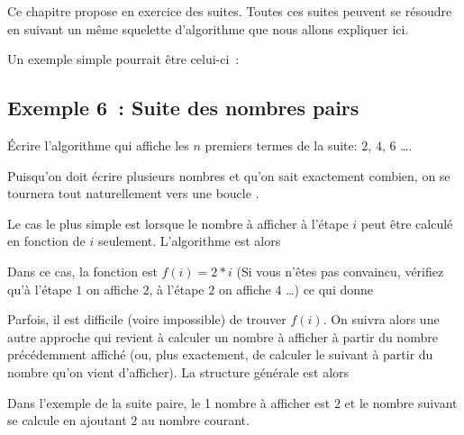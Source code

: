 Ce chapitre propose en exercice des suites.
Toutes ces suites peuvent se résoudre 
en suivant un même squelette d'algorithme 
que nous allons expliquer ici.

Un exemple simple pourrait être celui-ci~:

\subsection{Exemple 6~: Suite des nombres pairs}
	Écrire l'algorithme qui affiche les $n$ premiers termes
	de la suite: $2$, $4$, $6$ \dots.


Puisqu'on doit écrire plusieurs nombres et qu'on sait exactement combien,
on se tournera tout naturellement vers une boucle .

Le cas le plus simple est lorsque le nombre à afficher à l'étape $i$
peut être calculé en fonction de $i$ seulement.
L'algorithme est alors


Dans ce cas, la fonction est $f(i)=2*i$
(Si vous n'êtes pas convaincu, vérifiez qu'à l'étape $1$ on affiche $2$,
à l'étape $2$ on affiche $4$ \dots) ce qui donne


Parfois, il est difficile (voire impossible) de trouver $f(i)$.
On suivra alors une autre approche qui revient à calculer un nombre
à afficher à partir du nombre précédemment affiché
(ou, plus exactement, de calculer le suivant à partir du nombre
qu'on vient d'afficher).
La structure générale est alors


Dans l'exemple de la suite paire, le 1 nombre à afficher est $2$
et le nombre suivant se calcule en ajoutant $2$ au nombre courant.


